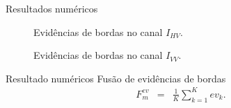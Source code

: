 \documentclass[10pt]{beamer}
\begin{document}
\begin{frame}{Resultados numéricos}
\begin{figure}[hbt]
\caption{Evidências de bordas no canal $I_{HV}$.}\label{cap_acf_fig08}
\endminipage\hfill
{}
\caption{Evidências de bordas no canal $I_{VV}$.}\label{cap_acf_fig09}
\endminipage\hfill
\end{figure}
\end{frame}
\begin{frame}{Resultado numéricos}
\alert{Fusão de evidências de bordas}
  \begin{equation}\label{cap_acf_27}
\begin{array}{lll}
	F_{m}^{ev} &=&\frac{1}{K}\displaystyle{\sum_{k=1}^{K}ev_k}. 
\end{array}
\end{equation}
\end{frame}
\end{document}
